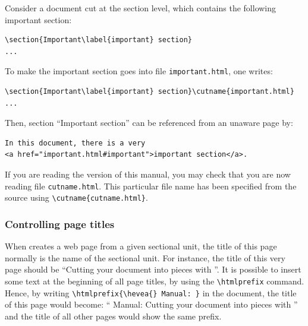 Consider a document cut at the section level, which contains the
following important section:
\begin{verbatim}
\section{Important\label{important} section}
...
\end{verbatim}
To make the important section goes into file \texttt{important.html},
one writes:
\begin{verbatim}
\section{Important\label{important} section}\cutname{important.html}
...
\end{verbatim}
Then, section ``Important section'' can be referenced from
an \hevea{} unaware \html{} page by:
\begin{verbatim}
In this document, there is a very
<a href="important.html#important">important section</a>.
\end{verbatim}
\ifhevea
If you are reading the \html{} version of this manual, you may check
that you are now reading file \texttt{cutname.html}.
This particular file name has been specified from the source
using \verb+\cutname{cutname.html}+.
\fi

\subsubsection{Controlling page titles}
When \hacha{} creates a web page from a given sectional unit,
the title of this page normally is the name of the sectional unit.
For instance, the title of this very page should be
``Cutting your document into pieces with \hacha''.
It is possible to insert some text at the beginning of all page
titles, by using the \verb+\htmlprefix+ command.
Hence, by writing
\verb+\htmlprefix{\hevea{} Manual: }+ in the document,
the title of this page would become:
``\hevea{} Manual: Cutting your document into pieces with \hacha''
and the title of all other pages would show the same prefix.

